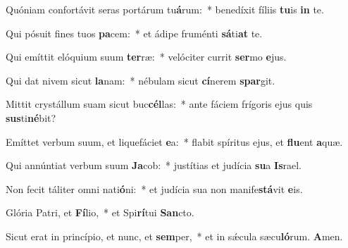 \item Quóniam confortávit seras portárum tu\textbf{á}rum:~* benedíxit fíliis \textbf{tu}is \textbf{in} te.
\item Qui pósuit fines tuos \textbf{pa}cem:~* et ádipe fruménti \textbf{sá}ti\textbf{at} te.
\item Qui emíttit elóquium suum \textbf{ter}ræ:~* velóciter currit \textbf{ser}mo \textbf{e}jus.
\item Qui dat nivem sicut \textbf{la}nam:~* nébulam sicut \textbf{cí}nerem \textbf{spar}git.
\item Mittit crystállum suam sicut buc\textbf{cél}las:~* ante fáciem frígoris ejus quis \textbf{sus}ti\textbf{né}bit?
\item Emíttet verbum suum, et liquefáciet \textbf{e}a:~* flabit spíritus ejus, et \textbf{flu}ent \textbf{a}quæ.
\item Qui annúntiat verbum suum \textbf{Ja}cob:~* justítias et judícia \textbf{su}a \textbf{Is}rael.
\item Non fecit táliter omni nati\textbf{ó}ni:~* et judícia sua non manife\textbf{stá}vit \textbf{e}is.
\item Glória Patri, et \textbf{Fí}lio,~* et Spi\textbf{rí}tui \textbf{San}cto.
\item Sicut erat in princípio, et nunc, et \textbf{sem}per,~* et in sǽcula sæcu\textbf{ló}rum. \textbf{A}men.
